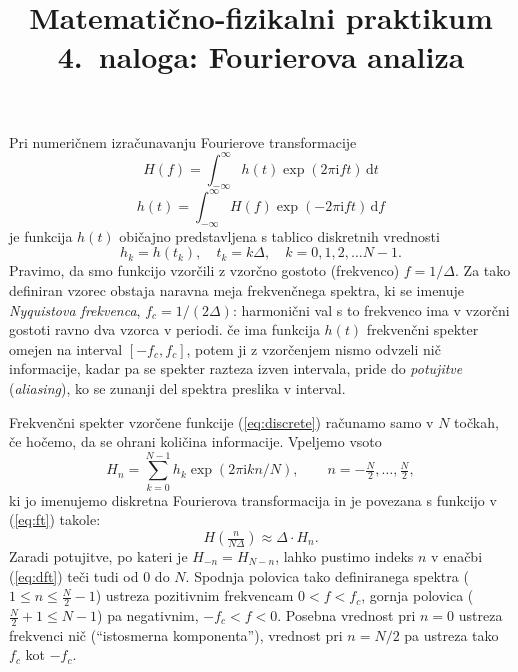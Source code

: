 \documentclass[slovene,11pt,a4paper]{article}
\title{
\sc\large Matematično-fizikalni praktikum \thisyear \\
\bigskip
\bf\Large 4.~naloga: Fourierova analiza
}
\author{}
\date{}
\newcommand{\dd}{\,\mathrm{d}}
\newcommand{\ii}{\mathrm{i}}
\begin{document}
\maketitle
\vspace{-1cm}


Pri numeričnem izračunavanju Fourierove transformacije
\begin{equation}
H(f) = \int_{-\infty}^\infty
h(t)\exp(2 \pi \ii f t)\dd t
\label{eq:ft}
\end{equation}
\begin{equation}
h(t) = \int_{-\infty}^\infty
H(f)\exp(-2 \pi \ii f t)\dd f
\end{equation}
je funkcija $h(t)$ običajno predstavljena s tablico diskretnih
vrednosti
\begin{equation}
  h_k = h(t_k),\quad t_k = k \Delta, \quad k=0,1,2,\dots N-1.
  \label{eq:discrete}
\end{equation}
Pravimo, da smo funkcijo vzorčili z vzorčno gostoto (frekvenco) $f=1/\Delta$.
Za tako definiran vzorec obstaja naravna meja frekvenčnega spektra,
ki se imenuje {\sl Nyquistova frekvenca}, $f_c =1/(2\Delta)$:
harmonični val s to frekvenco ima v vzorčni gostoti ravno
dva vzorca v periodi.
če ima funkcija $h(t)$ frekvenčni spekter omejen na interval
$[-f_c, f_c ]$, potem ji z vzorčenjem nismo odvzeli nič informacije,
kadar pa se spekter razteza izven intervala, pride do {\sl potujitve\/}
({\sl aliasing\/}), ko se zunanji del spektra preslika v interval.

Frekvenčni spekter vzorčene funkcije (\ref{eq:discrete}) računamo samo
v $N$ točkah, če hočemo, da se ohrani količina informacije.
Vpeljemo vsoto
\begin{equation}
H_n = \sum_{k=0}^{N-1}
h_k \exp(2 \pi \ii k n / N),
\qquad n=-\tfrac{N}{2},\dots ,\tfrac{N}{2},
\label{eq:dft}
\end{equation}
ki jo imenujemo diskretna Fourierova transformacija
in je povezana s funkcijo v (\ref{eq:ft}) takole:
\begin{equation*}
H(\tfrac{n}{N\Delta}) \approx \Delta\cdot H_n .
\end{equation*}
Zaradi potujitve, po kateri je $H_{-n} = H_{N-n}$, lahko pustimo
indeks $n$ v enačbi (\ref{eq:dft}) teči tudi od 0 do $N$. Spodnja polovica
tako definiranega spektra ($1 \le n \le \tfrac{N}{2}-1$) ustreza pozitivnim
frekvencam $0 < f < f_c$, gornja polovica ($\tfrac{N}{2}+1 \le N-1$)
pa negativnim, $-f_c < f < 0$.  Posebna vrednost pri $n=0$
ustreza frekvenci nič (``istosmerna komponenta''), vrednost
pri $n=N/2$ pa ustreza tako $f_c$ kot $-f_c$.
\end{document}
